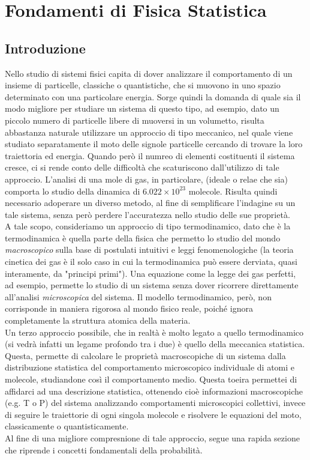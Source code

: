\chapter{Fondamenti di Fisica Statistica}
\section{Introduzione}

Nello studio di sistemi fisici capita di dover analizzare il comportamento di un insieme di particelle, classiche o quantistiche, che si muovono in uno spazio determinato con una particolare energia. Sorge quindi la domanda di quale sia il modo migliore per studiare un sistema di questo tipo, ad esempio, dato un piccolo numero di particelle libere di muoversi in un volumetto, risulta abbastanza naturale utilizzare un approccio di tipo meccanico, nel quale viene studiato separatamente il moto delle signole particelle cercando di trovare la loro traiettoria ed energia. Quando però il numreo di elementi costituenti il sistema cresce, ci si rende conto delle difficoltà che scaturiscono dall'utilizzo di tale approccio. L'analisi di una mole di gas, in particolare, (ideale o relae che sia) comporta lo studio della dinamica di $6.022\times 10^{23}$ molecole. Risulta quindi necessario adoperare un diverso metodo, al fine di semplificare l'indagine su un tale sistema, senza però perdere l'accuratezza nello studio delle sue proprietà.
\\
A tale scopo, consideriamo un approccio di tipo termodinamico, dato che è la termodinamica è quella parte della fisica che permetto lo studio del mondo \textit{macroscopico} sulla base di postulati intuitivi e leggi fenomenologiche (la teoria cinetica dei gas è il solo caso in cui la termodinamica può essere derviata, quasi interamente, da "principi primi"). Una equazione come la legge dei gas perfetti, ad esempio, permette lo studio di un sistema senza dover ricorrere direttamente all'analisi \textit{microscopica} del sistema. Il modello termodinamico, però, non corrisponde in maniera rigorosa al mondo fisico reale, poiché ignora completamente la struttura atomica della materia.
\\
Un terzo approccio possibile, che in realtà è molto legato a quello termodinamico (si vedrà infatti un legame profondo tra i due) è quello della meccanica statistica. Questa, permette di calcolare le proprietà macroscopiche di un sistema dalla distribuzione statistica del comportamento microscopico individuale di atomi e molecole, studiandone così il comportamento medio. Questa toeira permettei di affidarci ad una descrizione statistica, ottenendo cioè informazioni macroscopiche (e.g. T o P) del sistema analizzando comportamenti microscopici collettivi, invece di seguire le traiettorie di ogni singola molecole e risolvere le equazioni del moto, classicamente o quantisticamente.
\\
Al fine di una migliore compresnione di tale approccio, segue una rapida sezione che riprende i concetti fondamentali della probabilità.

